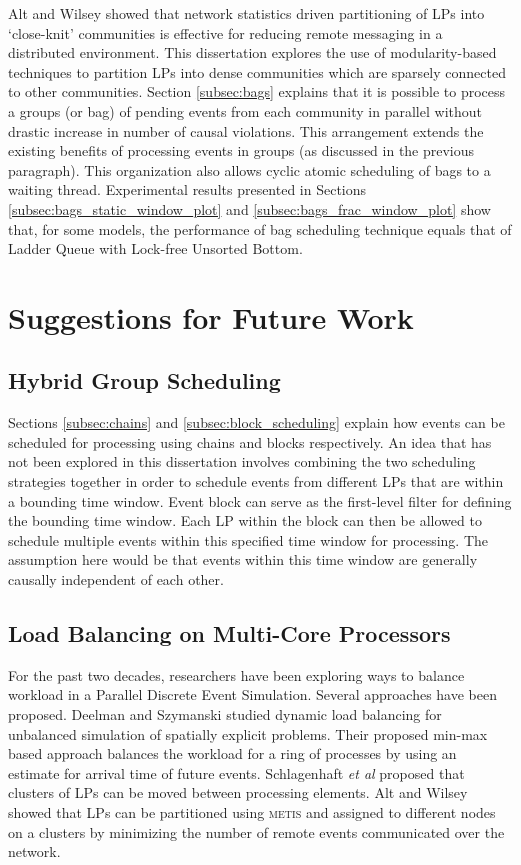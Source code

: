 \documentclass[11pt]{book}
\begin{document}
Alt and Wilsey \cite{alt-14} showed that network statistics driven partitioning of LPs into `close-knit'
communities is effective for reducing remote messaging in a distributed environment.  This dissertation
explores the use of modularity-based techniques \cite{blondel-08} to partition LPs into dense communities
which are sparsely connected to other communities.  Section \ref{subsec:bags} explains that it is possible to
process a groups (or bag) of pending events from each community in parallel without drastic increase in number
of causal violations.  This arrangement extends the existing benefits of processing events in groups (as
discussed in the previous paragraph).  This organization also allows cyclic atomic scheduling of bags to a
waiting thread.  Experimental results presented in Sections \ref{subsec:bags_static_window_plot} and
\ref{subsec:bags_frac_window_plot} show that, for some models, the performance of bag scheduling technique
equals that of Ladder Queue with Lock-free Unsorted Bottom.


\section[Future Work]{Suggestions for Future Work}

\subsection{Hybrid Group Scheduling}

Sections \ref{subsec:chains} and \ref{subsec:block_scheduling} explain how events can be scheduled for
processing using chains and blocks respectively.  An idea that has not been explored in this dissertation
involves combining the two scheduling strategies together in order to schedule events from different LPs that
are within a bounding time window.  Event block can serve as the first-level filter for defining the bounding
time window.  Each LP within the block can then be allowed to schedule multiple events within this specified
time window for processing.  The assumption here would be that events within this time window are generally
causally independent of each other.

\subsection{Load Balancing on Multi-Core Processors}

For the past two decades, researchers have been exploring ways to balance workload in a Parallel Discrete
Event Simulation.  Several approaches have been proposed.  Deelman and Szymanski \cite{deelman-98} studied
dynamic load balancing for unbalanced simulation of spatially explicit problems.  Their proposed min-max based
approach balances the workload for a ring of processes by using an estimate for arrival time of future
events. Schlagenhaft \emph{et al} \cite{schlagenhaft-95} proposed that clusters of LPs can be moved between
processing elements.  Alt and Wilsey \cite{alt-14} showed that LPs can be partitioned using \textsc{metis}
\cite{karypis-98} and assigned to different nodes on a clusters by minimizing the number of remote events
communicated over the network.
\end{document}
